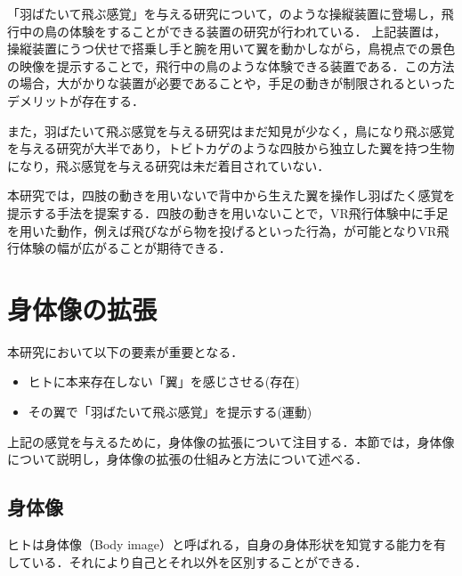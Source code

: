 \begin{small}
    「羽ばたいて飛ぶ感覚」を与える研究について，のような操縦装置に登場し，飛行中の鳥の体験をすることができる装置の研究が行われている\cite{rheiner2014birdly}．
    上記装置は，操縦装置にうつ伏せで搭乗し手と腕を用いて翼を動かしながら，鳥視点での景色の映像を提示することで，飛行中の鳥のような体験できる装置である．この方法の場合，大がかりな装置が必要であることや，手足の動きが制限されるといったデメリットが存在する．
    
    また，羽ばたいて飛ぶ感覚を与える研究はまだ知見が少なく，鳥になり飛ぶ感覚を与える研究が大半であり，トビトカゲのような四肢から独立した翼を持つ生物になり，飛ぶ感覚を与える研究は未だ着目されていない．

    本研究では，四肢の動きを用いないで背中から生えた翼を操作し羽ばたく感覚を提示する手法を提案する．四肢の動きを用いないことで，VR飛行体験中に手足を用いた動作，例えば飛びながら物を投げるといった行為，が可能となりVR飛行体験の幅が広がることが期待できる．

\section{身体像の拡張}
  本研究において以下の要素が重要となる．
  \begin{itemize}
      \item ヒトに本来存在しない「翼」を感じさせる(存在)
      \item その翼で「羽ばたいて飛ぶ感覚」を提示する(運動)
  \end{itemize}
  上記の感覚を与えるために，身体像の拡張について注目する．本節では，身体像について説明し，身体像の拡張の仕組みと方法について述べる．

  \subsection{身体像}
    ヒトは身体像（Body image）\cite{head1911sensory}と呼ばれる，自身の身体形状を知覚する能力を有している．それにより自己とそれ以外を区別することができる．




\end{small}
